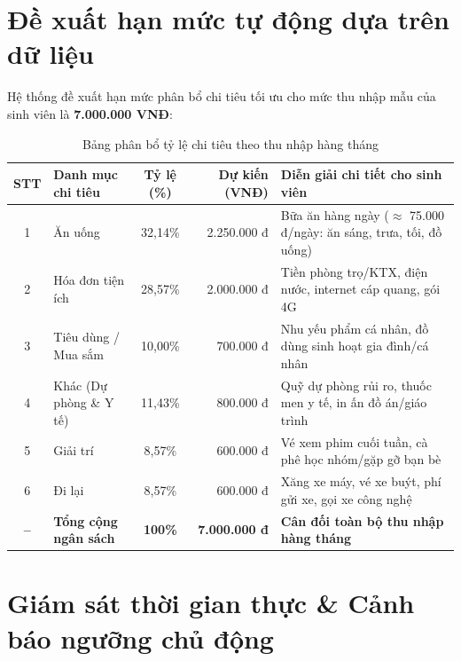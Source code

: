 \documentclass[11pt, a4paper]{article}
\begin{document}
\section{Đề xuất hạn mức tự động dựa trên dữ liệu}
Hệ thống đề xuất hạn mức phân bổ chi tiêu tối ưu cho mức thu nhập mẫu của sinh viên là \textbf{7.000.000 VNĐ}:

\begin{table}[htbp]
\centering
\caption{Bảng phân bổ tỷ lệ chi tiêu theo thu nhập hàng tháng}
\vspace{0.5em}
\small
\begin{tabularx}{\textwidth}{c X c r X}
\toprule
\rowcolor{tableheader}
\textbf{STT} & \textbf{Danh mục chi tiêu} & \textbf{Tỷ lệ (\%)} & \textbf{Dự kiến (VNĐ)} & \textbf{Diễn giải chi tiết cho sinh viên} \\
\midrule
1 & Ăn uống & 32,14\% & 2.250.000 đ & Bữa ăn hàng ngày ($\approx$ 75.000 đ/ngày: ăn sáng, trưa, tối, đồ uống) \\
2 & Hóa đơn tiện ích & 28,57\% & 2.000.000 đ & Tiền phòng trọ/KTX, điện nước, internet cáp quang, gói 4G \\
3 & Tiêu dùng / Mua sắm & 10,00\% & 700.000 đ & Nhu yếu phẩm cá nhân, đồ dùng sinh hoạt gia đình/cá nhân \\
4 & Khác (Dự phòng \& Y tế) & 11,43\% & 800.000 đ & Quỹ dự phòng rủi ro, thuốc men y tế, in ấn đồ án/giáo trình \\
5 & Giải trí & 8,57\% & 600.000 đ & Vé xem phim cuối tuần, cà phê học nhóm/gặp gỡ bạn bè \\
6 & Đi lại & 8,57\% & 600.000 đ & Xăng xe máy, vé xe buýt, phí gửi xe, gọi xe công nghệ \\
\midrule
\rowcolor{lightbg}
\textbf{--} & \textbf{Tổng cộng ngân sách} & \textbf{100\%} & \textbf{7.000.000 đ} & \textbf{Cân đối toàn bộ thu nhập hàng tháng} \\
\bottomrule
\end{tabularx}
\end{table}

\section{Giám sát thời gian thực \& Cảnh báo ngưỡng chủ động}
\end{document}
